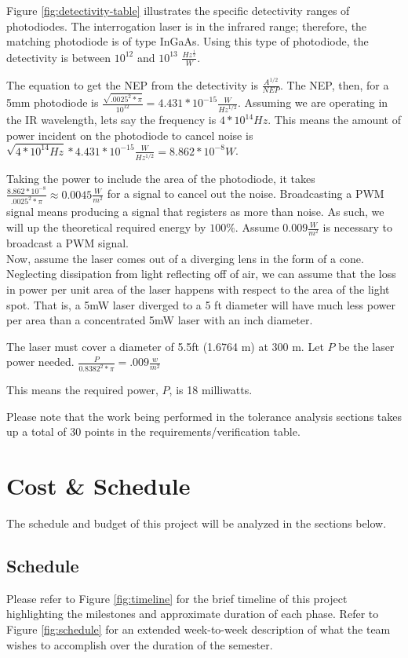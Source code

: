 \documentclass[openbib,letterpaper,10pt]{article}
\begin{document}
\begin{spacing}{1.15}
Figure \ref{fig:detectivity-table} illustrates the specific detectivity ranges of photodiodes. The interrogation laser is in the infrared range; therefore, the matching photodiode is of type InGaAs. Using this type of photodiode, the detectivity is between $10^{12}$ and $10^{13}$ $\frac{Hz^{\frac{1}{2}}}{W}$. 

The equation to get the NEP from the detectivity is $\frac{A^{1/2}}{NEP}$. The NEP, then, for a 5mm photodiode is $\frac{\sqrt{.0025^2 * \pi}}{10^{12}} = 4.431 * 10^{-15} \frac{W}{Hz^{1/2}}$. Assuming we are operating in the IR wavelength, lets say the frequency is $4*10^{14} Hz$. This means the amount of power incident on the photodiode to cancel noise is $\sqrt{4*10^{14}Hz} * 4.431 * 10^{-15} \frac{W}{Hz^{1/2}} = 8.862*10^{-8} W$. 

Taking the power to include the area of the photodiode, it takes $\frac{8.862*10^{-8}}{.0025^2 * \pi} \approx 0.0045 \frac{W}{m^2}$ for a signal to cancel out the noise. Broadcasting a PWM signal means producing a signal that registers as more than noise. As such, we will up the theoretical required energy by $100\%$. Assume $0.009 \frac{W}{m^2}$ is necessary to broadcast a PWM signal. \\

Now, assume the laser comes out of a diverging lens in the form of a cone. Neglecting dissipation from light reflecting off of air, we can assume that the loss in power per unit area of the laser happens with respect to the area of the light spot. That is, a 5mW laser diverged to a 5 ft diameter will have much less power per area than a concentrated 5mW laser with an inch diameter.

The laser must cover a diameter of 5.5ft (1.6764 m) at 300 m. Let $P$ be the laser power needed. $\frac{P}{0.8382^2* \pi} = .009  \frac{w}{m^2}$

This means the required power, $P$, is 18 milliwatts. 

Please note that the work being performed in the tolerance analysis sections takes up a total of 30 points in the requirements/verification table. 


\section{Cost \& Schedule}
The schedule and budget of this project will be analyzed in the sections below.

\subsection{Schedule}
Please refer to Figure \ref{fig:timeline} for the brief timeline of this project highlighting the milestones and approximate duration of each phase. Refer to Figure \ref{fig:schedule} for an extended week-to-week description of what the team wishes to accomplish over the duration of the semester.



\end{spacing}
\end{document}
